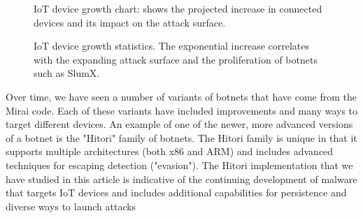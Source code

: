 \documentclass[12pt,letterpaper]{report}
\begin{document}
\begin{figure}[htbp]
    \centering
    \caption{IoT device growth statistics. The exponential increase correlates with the expanding attack surface and the proliferation of botnets such as SlumX.}
        \begin{center}\small IoT device growth chart: shows the projected increase in connected devices and its impact on the attack surface.\end{center}
    \label{fig:iot_stats}
\end{figure}



Over time, we have seen a number of variants of botnets that have come from the Mirai code. Each of these variants have included improvements and many ways to target different devices\cite{bertino2016botnets}. An example of one of the newer, more advanced versions of a botnet is the "Hitori" family of botnets. The Hitori family is unique in that it supports multiple architectures (both x86 and ARM) and includes advanced techniques for escaping detection ("evasion"). The Hitori implementation that we have studied in this article is indicative of the continuing development of malware that targets IoT devices and includes additional capabilities for persistence and diverse ways to launch attacks
\end{document}
